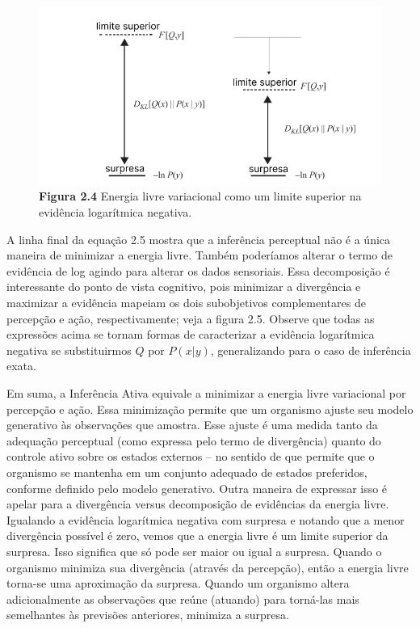 \documentclass[
  12pt,
]{book}
\begin{document}
\begin{figure}
\centering
\includegraphics{images/Figura2_4.png}
\caption{\textbf{Figura 2.4} Energia livre variacional como um limite superior na evidência logarítmica negativa.}
\end{figure}

A linha final da equação 2.5 mostra que a inferência perceptual não é a única maneira de minimizar a energia livre. Também poderíamos alterar o termo de evidência de log agindo para alterar os dados sensoriais. Essa decomposição é interessante do ponto de vista cognitivo, pois minimizar a divergência e maximizar a evidência mapeiam os dois subobjetivos complementares de percepção e ação, respectivamente; veja a figura 2.5. Observe que todas as expressões acima se tornam formas de caracterizar a evidência logarítmica negativa se substituirmos \(Q\) por \(P( x| y)\), generalizando para o caso de inferência exata.

Em suma, a Inferência Ativa equivale a minimizar a energia livre variacional por percepção e ação. Essa minimização permite que um organismo ajuste seu modelo generativo às observações que amostra. Esse ajuste é uma medida tanto da adequação perceptual (como expressa pelo termo de divergência) quanto do controle ativo sobre os estados externos -- no sentido de que permite que o organismo se mantenha em um conjunto adequado de estados preferidos, conforme definido pelo modelo generativo. Outra maneira de expressar isso é apelar para a divergência versus decomposição de evidências da energia livre. Igualando a evidência logarítmica negativa com surpresa e notando que a menor divergência possível é zero, vemos que a energia livre é um limite superior da surpresa. Isso significa que só pode ser maior ou igual a surpresa. Quando o organismo minimiza sua divergência (através da percepção), então a energia livre torna-se uma aproximação da surpresa. Quando um organismo altera adicionalmente as observações que reúne (atuando) para torná-las mais semelhantes às previsões anteriores, minimiza a surpresa.
\end{document}
